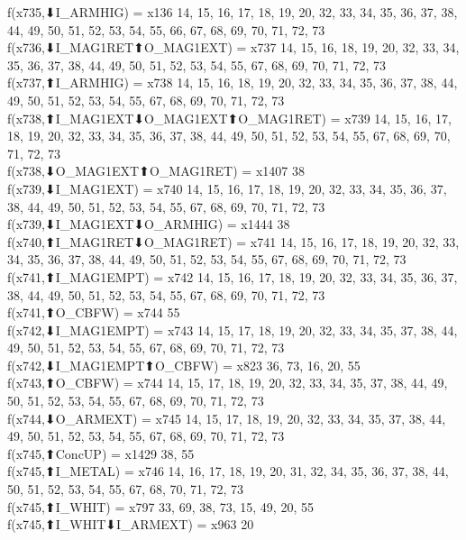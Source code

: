 f(x735,⬇I_ARMHIG) = x136 {14, 15, 16, 17, 18, 19, 20, 32, 33, 34, 35, 36, 37, 38, 44, 49, 50, 51, 52, 53, 54, 55, 66, 67, 68, 69, 70, 71, 72, 73} \\
f(x736,⬇I_MAG1RET⬆O_MAG1EXT) = x737 {14, 15, 16, 18, 19, 20, 32, 33, 34, 35, 36, 37, 38, 44, 49, 50, 51, 52, 53, 54, 55, 67, 68, 69, 70, 71, 72, 73} \\
f(x737,⬆I_ARMHIG) = x738 {14, 15, 16, 18, 19, 20, 32, 33, 34, 35, 36, 37, 38, 44, 49, 50, 51, 52, 53, 54, 55, 67, 68, 69, 70, 71, 72, 73} \\
f(x738,⬆I_MAG1EXT⬇O_MAG1EXT⬆O_MAG1RET) = x739 {14, 15, 16, 17, 18, 19, 20, 32, 33, 34, 35, 36, 37, 38, 44, 49, 50, 51, 52, 53, 54, 55, 67, 68, 69, 70, 71, 72, 73} \\
f(x738,⬇O_MAG1EXT⬆O_MAG1RET) = x1407 {38} \\
f(x739,⬇I_MAG1EXT) = x740 {14, 15, 16, 17, 18, 19, 20, 32, 33, 34, 35, 36, 37, 38, 44, 49, 50, 51, 52, 53, 54, 55, 67, 68, 69, 70, 71, 72, 73} \\
f(x739,⬇I_MAG1EXT⬇O_ARMHIG) = x1444 {38} \\
f(x740,⬆I_MAG1RET⬇O_MAG1RET) = x741 {14, 15, 16, 17, 18, 19, 20, 32, 33, 34, 35, 36, 37, 38, 44, 49, 50, 51, 52, 53, 54, 55, 67, 68, 69, 70, 71, 72, 73} \\
f(x741,⬆I_MAG1EMPT) = x742 {14, 15, 16, 17, 18, 19, 20, 32, 33, 34, 35, 36, 37, 38, 44, 49, 50, 51, 52, 53, 54, 55, 67, 68, 69, 70, 71, 72, 73} \\
f(x741,⬆O_CBFW) = x744 {55} \\
f(x742,⬇I_MAG1EMPT) = x743 {14, 15, 17, 18, 19, 20, 32, 33, 34, 35, 37, 38, 44, 49, 50, 51, 52, 53, 54, 55, 67, 68, 69, 70, 71, 72, 73} \\
f(x742,⬇I_MAG1EMPT⬆O_CBFW) = x823 {36, 73, 16, 20, 55} \\
f(x743,⬆O_CBFW) = x744 {14, 15, 17, 18, 19, 20, 32, 33, 34, 35, 37, 38, 44, 49, 50, 51, 52, 53, 54, 55, 67, 68, 69, 70, 71, 72, 73} \\
f(x744,⬇O_ARMEXT) = x745 {14, 15, 17, 18, 19, 20, 32, 33, 34, 35, 37, 38, 44, 49, 50, 51, 52, 53, 54, 55, 67, 68, 69, 70, 71, 72, 73} \\
f(x745,⬆ConcUP) = x1429 {38, 55} \\
f(x745,⬆I_METAL) = x746 {14, 16, 17, 18, 19, 20, 31, 32, 34, 35, 36, 37, 38, 44, 50, 51, 52, 53, 54, 55, 67, 68, 70, 71, 72, 73} \\
f(x745,⬆I_WHIT) = x797 {33, 69, 38, 73, 15, 49, 20, 55} \\
f(x745,⬆I_WHIT⬇I_ARMEXT) = x963 {20} \\
